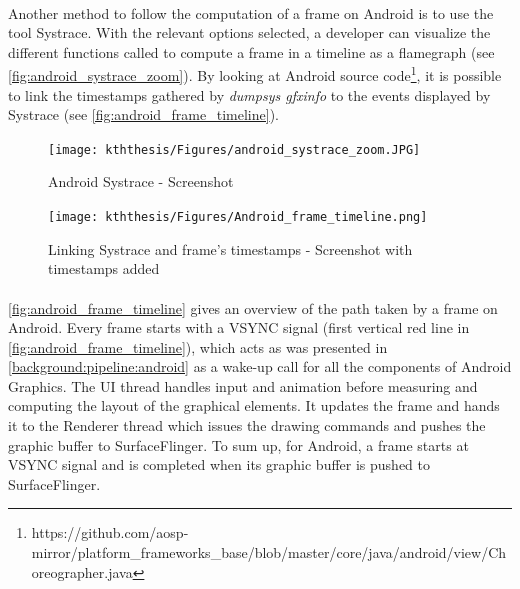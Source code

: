 \documentclass{kththesis}
\begin{document}
    \paragraph{}
    Another method to follow the computation of a frame on Android is to use the tool Systrace. With the relevant options selected, a developer can visualize the different functions called to compute a frame in a timeline as a flamegraph (see \autoref{fig:android_systrace_zoom}). \newline
    By looking at Android source code\footnote{https://github.com/aosp-mirror/platform_frameworks_base/blob/master/core/java/android/view/Choreographer.java}, it is possible to link the timestamps gathered by \textit{dumpsys gfxinfo} to the events displayed by Systrace (see \autoref{fig:android_frame_timeline}). 
    
    \begin{figure}
        \centering
        \texttt{[image: kththesis/Figures/android\_systrace\_zoom.JPG]}
        \caption{Android Systrace - Screenshot}
        \label{fig:android_systrace_zoom}
    \end{figure}
    
    \begin{figure}[!ht]
        \centering
        \texttt{[image: kththesis/Figures/Android\_frame\_timeline.png]}
        \caption{Linking Systrace and frame's timestamps - Screenshot with timestamps added}
        \label{fig:android_frame_timeline}
    \end{figure}
    
    \paragraph{}
    \autoref{fig:android_frame_timeline} gives an overview of the path taken by a frame on Android. Every frame starts with a VSYNC signal (first vertical red line in \autoref{fig:android_frame_timeline}), which acts as was presented in \autoref{background:pipeline:android} as a wake-up call for all the components of Android Graphics. The UI thread handles input and animation before measuring and computing the layout of the graphical elements. It updates the frame and hands it to the Renderer thread which issues the drawing commands and pushes the graphic buffer to SurfaceFlinger. To sum up, for Android, a frame starts at VSYNC signal and is completed when its graphic buffer is pushed to SurfaceFlinger.
    
\end{document}
